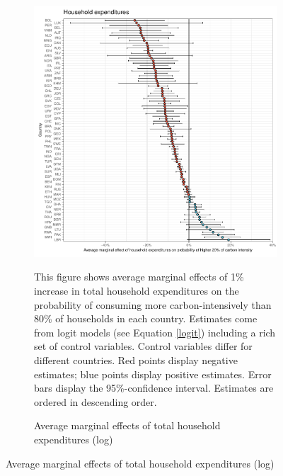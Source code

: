 \begin{figure}[ht!]
  \centering
  \caption{Average marginal effects (logit models)}\label{fig:Logit_ME}
  \begin{subfigure}[b]{\textwidth}
  \centering
  \includegraphics{1_Figures/Analysis_Logit_Models_Marginal_Effects/Average_Marginal_Effects_affected_upper_80_log_hh_expenditures_USD_2014_2017B.pdf}
  \caption{Average marginal effects of total household expenditures (log)} \label{fig:Logit_ME_exp}
  \begin{subcaption2}
     This figure shows average marginal effects of 1\% increase in total household expenditures on the probability of consuming more carbon-intensively than 80\% of households in each country. Estimates come from logit models (see Equation \ref{logit}) including a rich set of control variables. Control variables differ for different countries. Red points display negative estimates; blue points display positive estimates. Error bars display the 95\%-confidence interval. Estimates are ordered in descending order.
  \end{subcaption2}
  \end{subfigure}
 \end{figure}
 \clearpage

